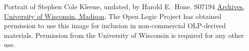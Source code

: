 Portrait of Stephen Cole Kleene, undated, by Harold E.~Hone. S07194
\href{www.library.wisc.edu/archives/}{Archives, University
of Wisconsin, Madison}. The Open Logic Project has obtained permission
to use this image for inclusion in non-commercial OLP-derived
materials. Permission from the University of Wisconsin is required
for any other use.
